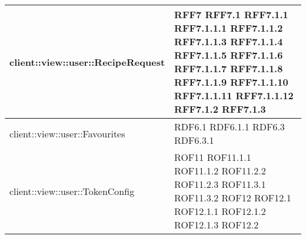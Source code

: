 \begin{center}
\begin{longtable}{| p{11cm} | p{2.5cm} |}
\hline
client::view::user::RecipeRequest & RFF7 \newline RFF7.1 \newline RFF7.1.1 \newline RFF7.1.1.1 \newline RFF7.1.1.2 \newline RFF7.1.1.3 \newline RFF7.1.1.4 \newline RFF7.1.1.5 \newline RFF7.1.1.6 \newline RFF7.1.1.7 \newline RFF7.1.1.8 \newline RFF7.1.1.9 \newline RFF7.1.1.10 \newline RFF7.1.1.11 \newline RFF7.1.1.12 \newline RFF7.1.2 \newline RFF7.1.3 \\
\hline
client::view::user::Favourites & RDF6.1 \newline RDF6.1.1 \newline RDF6.3 \newline RDF6.3.1 \\
\hline
client::view::user::TokenConfig & ROF11 \newline ROF11.1.1 \newline ROF11.1.2 \newline ROF11.2.2 \newline ROF11.2.3 \newline ROF11.3.1 \newline ROF11.3.2 \newline ROF12 \newline ROF12.1 \newline ROF12.1.1 \newline ROF12.1.2 \newline ROF12.1.3 \newline ROF12.2 \\
\hline

\end{longtable}
\end{center}
